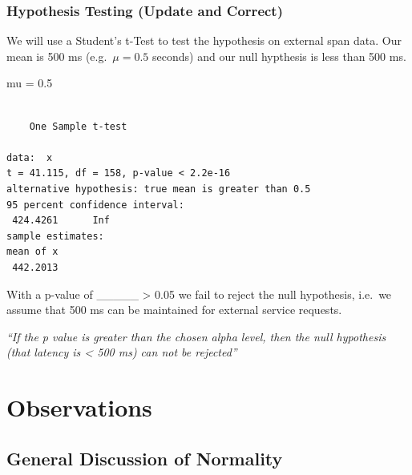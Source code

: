 \documentclass[
  letterpaper,
  DIV=11,
  numbers=noendperiod]{scrartcl}
\newenvironment{Shaded}{\begin{snugshade}}{\end{snugshade}}
\newcommand{\AttributeTok}[1]{\textcolor[rgb]{0.40,0.45,0.13}{#1}}
\newcommand{\FloatTok}[1]{\textcolor[rgb]{0.68,0.00,0.00}{#1}}
\newcommand{\FunctionTok}[1]{\textcolor[rgb]{0.28,0.35,0.67}{#1}}
\newcommand{\NormalTok}[1]{\textcolor[rgb]{0.00,0.23,0.31}{#1}}
\newcommand{\OtherTok}[1]{\textcolor[rgb]{0.00,0.23,0.31}{#1}}
\newcommand{\SpecialCharTok}[1]{\textcolor[rgb]{0.37,0.37,0.37}{#1}}
\newcommand{\StringTok}[1]{\textcolor[rgb]{0.13,0.47,0.30}{#1}}
\begin{document}
\hypertarget{hypothesis-testing-update-and-correct}{%
\subsubsection{Hypothesis Testing (Update and
Correct)}\label{hypothesis-testing-update-and-correct}}

We will use a Student's t-Test to test the hypothesis on external span
data. Our mean is 500 ms (e.g.~\(\mu = 0.5\) seconds) and our null
hypthesis is less than 500 ms.

\begin{Shaded}
\begin{Highlighting}[]
\NormalTok{mu }\OtherTok{=} \FloatTok{0.5}
\end{Highlighting}
\end{Shaded}

\begin{Shaded}
\end{Shaded}

\begin{verbatim}

    One Sample t-test

data:  x
t = 41.115, df = 158, p-value < 2.2e-16
alternative hypothesis: true mean is greater than 0.5
95 percent confidence interval:
 424.4261      Inf
sample estimates:
mean of x 
 442.2013 
\end{verbatim}

With a p-value of \_\_\_\_\_ \textgreater{} 0.05 we fail to reject the
null hypothesis, i.e.~we assume that 500 ms can be maintained for
external service requests.

\emph{``If the p value is greater than the chosen alpha level, then the
null hypothesis (that latency is \textless{} 500 ms) can not be
rejected''}

\hypertarget{observations}{%
\section{Observations}\label{observations}}

\hypertarget{general-discussion-of-normality}{%
\subsection{General Discussion of
Normality}\label{general-discussion-of-normality}}
\end{document}
